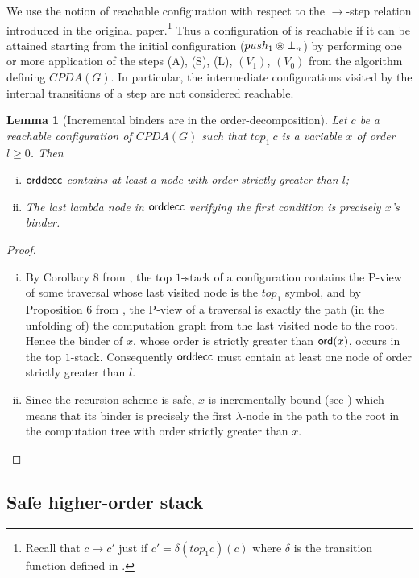 \documentclass{article}
\newtheorem{lemma}{Lemma}[section]
\theoremstyle{remark}
\theoremstyle{definition}
\newcommand\orddec{\sf orddec}
\begin{document}
We use the notion of reachable configuration
with respect to the $\rightarrow$-step relation introduced in the original paper.\footnote{Recall that $c\rightarrow c'$
just if $c' = \delta(top_1 c)(c)$ where $\delta$ is the transition
function defined in \cite[Figure 2]{hague-sto07}.} Thus a configuration of is reachable if it can be attained starting from the initial configuration ($push_1 \circledast \bot_n$) by performing one or more application of the steps (A), (S), (L), $(V_1)$, $(V_0)$ from the algorithm defining $CPDA(G)$.
In particular, the intermediate configurations visited by the internal transitions of a step are not considered reachable.

\begin{lemma}[Incremental binders are in the order-decomposition]
\label{lem:binder_in_ordecompos} Let $c$ be a reachable
configuration of $CPDA(G)$ such that $top_1\
c$ is a variable $x$ of order $l\geq 0$. Then
\begin{enumerate}[i.]
\item $\orddec{c}$ contains at least a node with order strictly
greater than $l$;
\item The last lambda node in $\orddec{c}$ verifying the first condition is precisely $x$'s binder.
\end{enumerate}
\end{lemma}
\begin{proof}
\begin{enumerate}[i.]
\item By Corollary 8 from \cite{hague-sto07}, the top $1$-stack of a configuration contains the P-view of some
    traversal whose last visited node is the $top_1$ symbol, and
    by Proposition 6 from \cite{OngLics2006}, the P-view of a
    traversal is exactly the path (in the unfolding of) the
    computation graph from the last visited node to
    the root. Hence the binder of $x$, whose order
    is strictly greater than ${\sf ord}(x)$, occurs in the top $1$-stack.
    Consequently $\orddec{c}$ must contain at least one node of order strictly greater than $l$.

\item Since the recursion scheme is safe, $x$ is
 incrementally bound (see \cite{blumong:safelambdacalculus})
 which means that its binder is precisely the first $\lambda$-node in the
 path to the root in the computation tree with order strictly
 greater than $x$.
\end{enumerate}
\end{proof}

\subsection{Safe higher-order stack}
\end{document}
